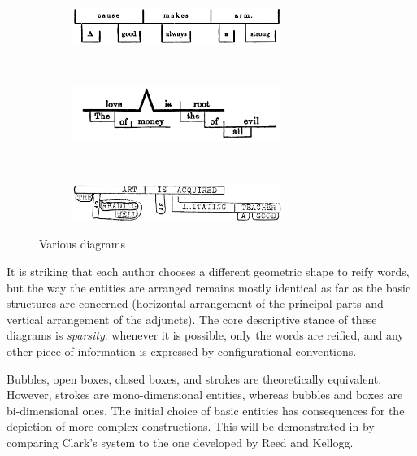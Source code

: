 \documentclass[english,output=paper,colorlinks,citecolor=brown]{../langscibook}
\begin{document}
\begin{figure}
    \begin{subfigure}[t]{\linewidth}\centering
	    \caption{\citealt[153]{Chandler1862}}
	  	\includegraphics[width=0.75\textwidth]{figures/04/Chandler.png}
    \end{subfigure}\medskip\\%
    \begin{subfigure}[t]{\linewidth}\centering
	    \caption{\citealt[265]{Burtt1869}}
	  	\includegraphics[width=0.75\textwidth]{figures/04/Burtt.png}
    \end{subfigure}\medskip\\%
    \begin{subfigure}[t]{\linewidth}\centering
	    \caption{\citealt[50]{Lighthall1872}}
	  	\includegraphics[width=0.75\textwidth]{figures/04/Lighthall.png}
    \end{subfigure}
    \caption{Various diagrams\label{fig:4:4}}
 \end{figure}

It is striking that each author chooses a different geometric shape to reify words, but the way the entities are arranged remains mostly identical as far as the basic structures are concerned (horizontal arrangement of the principal parts and vertical arrangement of the adjuncts). The core descriptive stance of these diagrams is \textit{sparsity}: whenever it is possible, only the words are reified, and any other piece of information is expressed by configurational conventions.

Bubbles, open boxes, closed boxes, and strokes are theoretically equivalent. However, strokes are mono-dimensional entities, whereas bubbles and boxes are bi-dimensional ones. The initial choice of basic entities has consequences for the depiction of more complex constructions. This will be demonstrated in  by comparing Clark’s system to the one developed by Reed and Kellogg.
\end{document}
